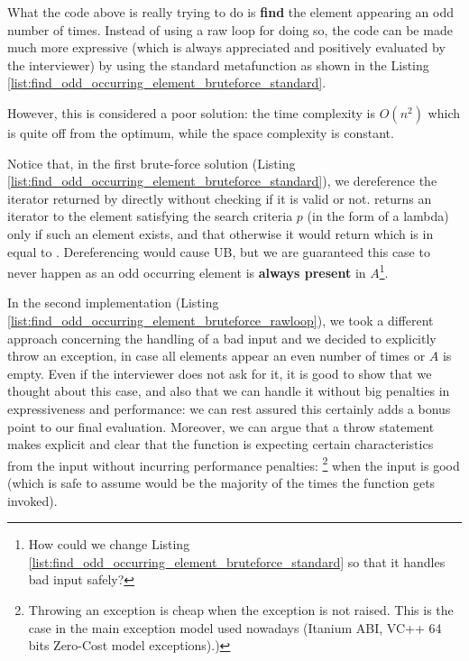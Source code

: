 What the code above is really trying to do is \textbf{find} the element appearing an odd number of times.
Instead of using a raw loop for doing so, the code can be made much more expressive (which is always appreciated and positively evaluated by the interviewer) by using the standard  metafunction  as shown in the Listing \ref{list:find_odd_occurring_element_bruteforce_standard}.




However, this is considered a poor solution: the time complexity is $O(n^2)$ which is quite off from the optimum, while the space complexity is constant. 


Notice that, in the first brute-force solution (Listing \ref{list:find_odd_occurring_element_bruteforce_standard}), we dereference the iterator returned by  directly without checking if it is valid or not. 
 returns an iterator to the element satisfying the search criteria $p$ (in the form of a lambda)  only if such an element exists, and that otherwise it would return  which is in  equal to .
Dereferencing  would cause UB, but we are guaranteed this case to never happen as an odd occurring element is \textbf{always present} in $A$\footnote{How could we change Listing \ref{list:find_odd_occurring_element_bruteforce_standard} so that it handles bad input safely?}.


In the second implementation (Listing \ref{list:find_odd_occurring_element_bruteforce_rawloop}), we took a different approach concerning the handling of a bad input and we decided to explicitly throw an exception, in case all elements appear an even number of times or $A$ is empty. 
Even if the interviewer does not ask for it, it is good to show that we thought about this case, and also that we can handle it without big penalties in expressiveness and performance: we can rest assured this certainly adds a bonus point to our final evaluation. 
Moreover, we can argue that a throw statement makes explicit and clear that the function is expecting certain characteristics from the input without incurring performance penalties: \footnote{Throwing an exception is cheap when the exception is not raised. This is the case in the main exception model used nowadays (Itanium ABI, VC++ 64 bits Zero-Cost model exceptions)\cite{cit:web:openstd_exception}.)} when the input is  good
(which is safe to assume would be the majority of the times the function gets invoked).

